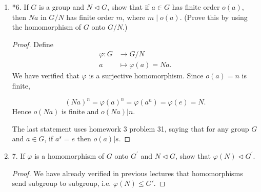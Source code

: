 \begin{enumerate}[resume]
\begin{proof}
	Hence $\varphi$ is an isomorphism from $G_1$ to $N$. Hence $G_1 \cong N$.
\end{proof}

(c) $G / N \simeq G_2$.
\begin{proof}
	Define the mapping
	\begin{align*}
		\varphi: G_2 &\longrightarrow G / N \\
		b &\longmapsto \varphi(b) = N (e_1,b)
	.\end{align*}
	It is clear that $\varphi$ is well-defined. To check that $\varphi$ is a homomorphism, note
	\[
		\varphi(a)\varphi(b) = N(e_1,a)N(e_1,b)
		=N(e_1,a)(e_1,b)
		=N(e_1,ab)
		=\varphi(ab)
	.\] 
	To check that $\varphi$ is injective, assume $\varphi(a) = \varphi(b)$. Hence $N(e_1,a) = N (e_1,b)$. Hence $(e, ab^{-1}) \in N$. But this means $ab^{-1} = e_2$ by definition of $N$. Therefore $a = b$.

	To check that $\varphi$ is surjective, let $(a,b) \in G$ and we claim that $\varphi(b) = N (a, b)$. But note that \[
		N(a,b) = N(a,e_2)(e_1,b) = N(e_1,b)
	\] 
	where the second inequality holds true since $(a,e_2) \in N$. Hence $\varphi(b) = N(e_1,b)$ from definition of $\varphi$.

	Now we have found a bijective homomorphism $\varphi: G_2 \to G / N$, so $G_2 \cong G / N$. Therefore $G / N \cong G_2$.
\end{proof}
\newpage
\item *6. If $G$ is a group and $N \triangleleft G$, show that if $a \in G$ has finite order $o(a)$, then $N a$ in $G / N$ has finite order $m$, where $m \mid o(a)$. (Prove this by using the homomorphism of $G$ onto $G / N$.)
\begin{proof}
	Define
	\begin{align*}
		\varphi: G &\longrightarrow G / N \\
		a &\longmapsto \varphi(a) = N a
	.\end{align*}
	We have verified that $\varphi$ is a surjective homomorphism. Since $o(a) = n$ is finite,

	\[
		(Na)^n = \varphi(a)^n = \varphi(a^n) = \varphi(e) = N
	.\] 
	Hence $o(Na)$ is finite and $o(Na) | n$. 

	The last statement uses homework 3 problem 31, saying that for any group $G $ and $a \in G$, if $a^s = e$ then $o(a) | s$.
\end{proof}

\item 7. If $\varphi$ is a homomorphism of $G$ onto $G^{\prime}$ and $N \triangleleft G$, show that $\varphi(N) \triangleleft G^{\prime}$.
\begin{proof}
	We have already verified in previous lectures that homomorphisms send subgroup to subgroup, i.e. $\varphi(N) \le  G'$.
	

\end{proof}
\end{enumerate}
